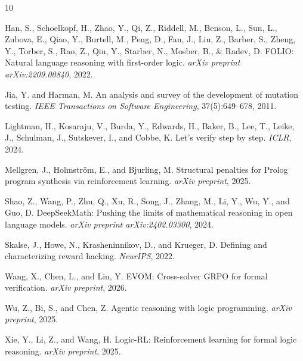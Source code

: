 \documentclass[11pt,a4paper]{article}
\begin{document}

\begin{thebibliography}{10}

Han, S., Schoelkopf, H., Zhao, Y., Qi, Z., Riddell, M., Benson, L., Sun, L., Zubova, E., Qiao, Y., Burtell, M., Peng, D., Fan, J., Liu, Z., Barber, S., Zheng, Y., Torber, S., Rao, Z., Qiu, Y., Starber, N., Mosber, B., \& Radev, D.
\newblock FOLIO: Natural language reasoning with first-order logic.
\newblock \emph{arXiv preprint arXiv:2209.00840}, 2022.

Jia, Y. and Harman, M.
\newblock An analysis and survey of the development of mutation testing.
\newblock \emph{IEEE Transactions on Software Engineering}, 37(5):649--678, 2011.

Lightman, H., Kosaraju, V., Burda, Y., Edwards, H., Baker, B., Lee, T., Leike, J., Schulman, J., Sutskever, I., and Cobbe, K.
\newblock Let's verify step by step.
\newblock \emph{ICLR}, 2024.

Mellgren, J., Holmstr{\"o}m, E., and Bjurling, M.
\newblock Structural penalties for Prolog program synthesis via reinforcement learning.
\newblock \emph{arXiv preprint}, 2025.

Shao, Z., Wang, P., Zhu, Q., Xu, R., Song, J., Zhang, M., Li, Y., Wu, Y., and Guo, D.
\newblock DeepSeekMath: Pushing the limits of mathematical reasoning in open language models.
\newblock \emph{arXiv preprint arXiv:2402.03300}, 2024.

Skalse, J., Howe, N., Krasheninnikov, D., and Krueger, D.
\newblock Defining and characterizing reward hacking.
\newblock \emph{NeurIPS}, 2022.

Wang, X., Chen, L., and Liu, Y.
\newblock EVOM: Cross-solver GRPO for formal verification.
\newblock \emph{arXiv preprint}, 2026.

Wu, Z., Bi, S., and Chen, Z.
\newblock Agentic reasoning with logic programming.
\newblock \emph{arXiv preprint}, 2025.

Xie, Y., Li, Z., and Wang, H.
\newblock Logic-RL: Reinforcement learning for formal logic reasoning.
\newblock \emph{arXiv preprint}, 2025.

\end{thebibliography}
\end{document}
